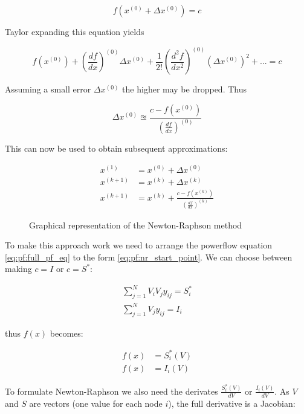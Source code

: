 \begin{equation}
    f(x^{(0)} + \Delta x^{(0)}) = c
\end{equation}

Taylor expanding this equation yields

\begin{equation}
    f(x^{(0)}) + (\frac{df}{dx})^{(0)} \Delta x^{(0)} + \frac{1}{2!} (\frac{d^2f}{dx^2})^{(0)} (\Delta x^{(0)})^2 + ... = c
\end{equation}

Assuming a small error $\Delta x^{(0)}$ the higher may be dropped. Thus

\begin{equation}
    \Delta x^{(0)} \approxeq \frac{c - f(x^{(0)}) }{ (\frac{df}{dx})^{(0)} }
\end{equation}

This can now be used to obtain subsequent approximations:

\begin{align}
    x^{(1)}   &= x^{(0)} + \Delta x^{(0)}\\
    x^{(k+1)} &= x^{(k)} + \Delta x^{(k)}\\
    x^{(k+1)} &= x^{(k)} + \frac{c - f(x^{(k)}) }{ (\frac{df}{dx})^{(k)} }
    \label{eq:pf:nr_iteration}
\end{align}

\begin{figure}[H]
    \centering
    
    \caption{
       Graphical representation of the Newton-Raphson method
    }
    \label{fig:pf:nr_graph}
\end{figure}

To make this approach work we need to arrange the powerflow equation \ref{eq:pf:full_pf_eq}
to the form \ref{eq:pf:nr_start_point}. We can choose between making $c = I$ or 
$c = S^*$:

\begin{align}
    \sum_{j = 1}^N V_i V_j y_{ij} = S^*_i\\
    \sum_{j = 1}^N V_j y_{ij} = I_i
    \label{eq:pf:nr_pf_starting_point}
\end{align}

thus $f(x)$ becomes:

\begin{align}
    f(x) &= S^*_i(V)\\
    f(x) &= I_i(V)
\end{align}

To formulate Newton-Raphson we also need the derivates $\frac{S^*_i(V)}{dV}$ or $\frac{I_i(V)}{dV}$. As $V$ and $S$ are vectors
(one value for each node $i$), the full derivative is a Jacobian:

